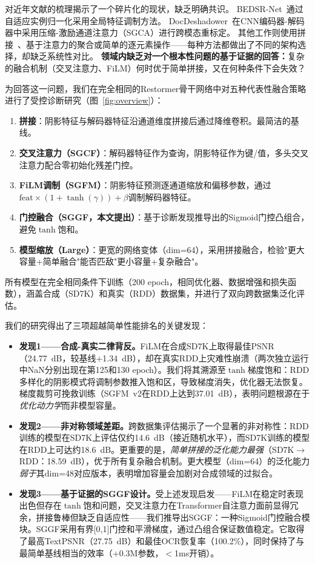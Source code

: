 \documentclass[11pt]{ctexart}
\begin{document}
对近年文献的梳理揭示了一个碎片化的现状，缺乏明确共识。
BEDSR-Net~\cite{lin2020document}通过自适应实例归一化采用全局特征调制方法。
DocDeshadower~\cite{li2023single}在CNN编码器-解码器中采用压缩-激励通道注意力（SGCA）进行跨模态重标定。
其他工作则使用拼接~\cite{Liuspectral}、基于注意力的聚合或简单的逐元素操作——每种方法都做出了不同的架构选择，却缺乏系统性对比。
\textbf{领域内缺乏对一个根本性问题的基于证据的回答：}复杂的融合机制（交叉注意力、FiLM）何时优于简单拼接，又在何种条件下会失效？

为回答这一问题，我们在完全相同的Restormer骨干网络中对五种代表性融合策略进行了受控诊断研究（图~\ref{fig:overview}）：

\begin{enumerate}
  \item \textbf{拼接}：阴影特征与解码器特征沿通道维度拼接后通过降维卷积。最简洁的基线。
  \item \textbf{交叉注意力（SGCF）}：解码器特征作为查询，阴影特征作为键/值，多头交叉注意力配合零初始化残差门控。
  \item \textbf{FiLM调制（SGFM）}：阴影特征预测逐通道缩放和偏移参数，通过$\text{feat} \times (1 + \tanh(\gamma)) + \beta$调制解码器特征。
  \item \textbf{门控融合（SGGF，本文提出）}：基于诊断发现推导出的Sigmoid门控凸组合，避免$\tanh$饱和。
  \item \textbf{模型缩放（Large）}：更宽的网络变体（dim=64），采用拼接融合，检验"更大容量+简单融合"能否匹敌"更小容量+复杂融合"。
\end{enumerate}

所有模型在完全相同条件下训练（200 epoch，相同优化器、数据增强和损失函数），涵盖合成（SD7K）和真实（RDD）数据集，并进行了双向跨数据集泛化评估。

我们的研究得出了三项超越简单性能排名的关键发现：

\begin{itemize}
  \item \textbf{发现1——合成-真实二律背反。}FiLM在合成SD7K上取得最佳PSNR（24.77~dB，较基线+1.34~dB），却在真实RDD上灾难性崩溃（两次独立运行中NaN分别出现在第125和130 epoch）。我们将其溯源至$\tanh$梯度饱和：RDD多样化的阴影模式将调制参数推入饱和区，导致梯度消失，优化器无法恢复。梯度裁剪可挽救训练（SGFM~v2在RDD上达到37.01~dB），表明问题根源在于\textit{优化动力学}而非模型容量。

  \item \textbf{发现2——非对称领域差距。}跨数据集评估揭示了一个显著的非对称性：RDD训练的模型在SD7K上评估仅约14.6~dB（接近随机水平），而SD7K训练的模型在RDD上可达约18.6~dB。更重要的是，\textit{简单拼接的泛化能力最强}（SD7K$\rightarrow$RDD：18.59~dB），优于所有复杂融合机制。更大模型（dim=64）的泛化能力\textit{弱于}其dim=48对应版本，表明增加容量会加剧对合成领域的过拟合。

  \item \textbf{发现3——基于证据的SGGF设计。}受上述发现启发——FiLM在稳定时表现出色但存在$\tanh$饱和问题，交叉注意力在Transformer自注意力面前显得冗余，拼接鲁棒但缺乏自适应性——我们推导出SGGF：一种Sigmoid门控融合模块。SGGF采用有界[0,1]门控和平滑梯度，通过凸组合保证数值稳定。它取得了最高TextPSNR（27.75~dB）和最佳OCR恢复率（100.2\%），同时保持了与最简单基线相当的效率（+0.3M参数，$<$1ms开销）。
\end{itemize}
\end{document}
